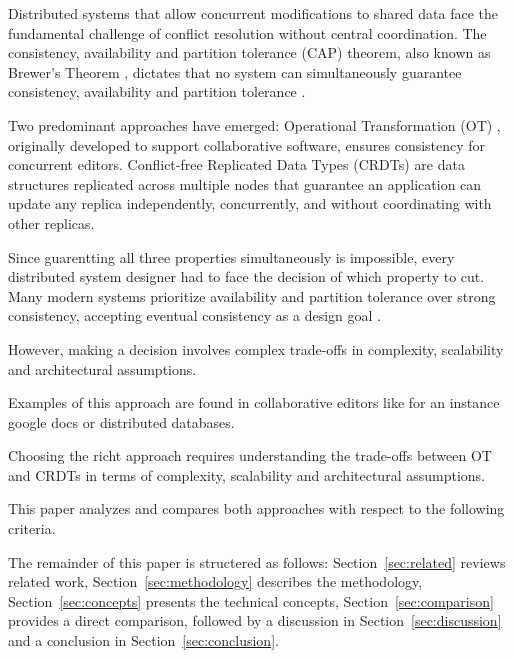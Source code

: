 Distributed systems that allow concurrent modifications to shared data face
the fundamental challenge of conflict resolution without central coordination.
The consistency, availability and partition tolerance (CAP) theorem, also known as
Brewer's Theorem \cite{CAP_Brewer}, dictates that no system can simultaneously
guarantee consistency, availability and partition tolerance \cite{CAP_main_aussage}.

Two predominant approaches have emerged:
Operational Transformation (OT) \cite{ellis1989concurrency}, originally developed
to support collaborative software, ensures consistency for concurrent editors.
Conflict-free Replicated Data Types (CRDTs) \cite{shapiro2011crdt} are data structures
replicated across multiple nodes that guarantee an application can update any replica
independently, concurrently, and without coordinating with other replicas.

Since guarentting all three properties simultaneously is impossible, every 
distributed system designer had to face the decision of which property to cut.
Many modern systems prioritize availability and partition tolerance over strong
consistency, accepting eventual consistency as a design goal \cite{vogels2009eventually}.

However, making a decision involves complex trade-offs in complexity, scalability
and architectural assumptions. 

Examples of this approach are found in collaborative editors 
like for an instance google docs or distributed databases.

Choosing the richt approach requires understanding the trade-offs between OT and
CRDTs in terms of complexity, scalability and architectural assumptions.

This paper analyzes and compares both approaches with respect to the following criteria.

The remainder of this paper is structered as follows: 
Section~\ref{sec:related}
reviews related work, Section~\ref{sec:methodology} describes the methodology,
Section~\ref{sec:concepts} presents the technical concepts, Section~\ref{sec:comparison}
provides a direct comparison, followed by a discussion in Section~\ref{sec:discussion}
and a conclusion in Section~\ref{sec:conclusion}.